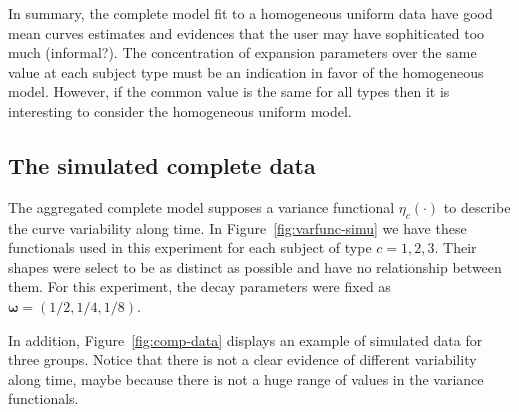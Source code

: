 In summary, the complete model fit to a homogeneous uniform data have good mean curves estimates and evidences that the user may have sophiticated too much (informal?). The concentration of expansion parameters over the same value at each subject type must be an indication in favor of the homogeneous model. However, if the common value is the same for all types then it is interesting to consider the homogeneous uniform model. 







\subsection{The simulated complete data}
\label{sec:comp-fit}




The aggregated complete model supposes a variance functional $\eta_c(\cdot)$ to describe the curve variability along time. In Figure~\ref{fig:varfunc-simu} we have these functionals used in this experiment for each subject of type $c=1,2,3$. Their shapes were select to be as distinct as possible and have no relationship between them. For this experiment, the decay parameters were fixed as $\boldsymbol \omega = (1/2,1/4,1/8)$.

In addition, Figure~\ref{fig:comp-data} displays an example of simulated data for three groups. Notice that there is not a clear evidence of different variability along time, maybe because there is not a huge range of values in the variance functionals.

